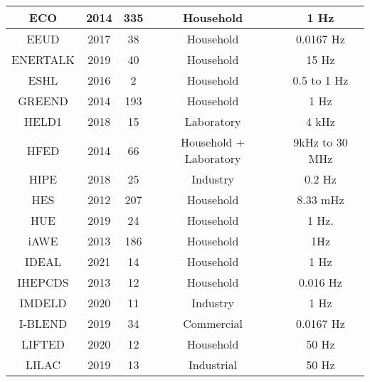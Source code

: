 \begin{table}[H]
{\begin{tabular}{|c|c|c|c|c|}
ECO \cite{ECO}                  & 2014 & 335  & Household              & 1 Hz                               \\ \hline
EEUD \cite{EEUD}                & 2017 & 38   & Household              & 0.0167 Hz                          \\ \hline
ENERTALK \cite{ENERTALK}        & 2019 & 40   & Household              & 15 Hz                              \\ \hline
ESHL \cite{ESHL}                & 2016 & 2    & Household              & {\color[HTML]{2E2E2E} 0.5 to 1 Hz} \\ \hline
GREEND \cite{GREEND}            & 2014 & 193  & Household              & 1 Hz                               \\ \hline
HELD1 \cite{HELD1}              & 2018 & 15   & Laboratory             & 4 kHz                              \\ \hline
HFED \cite{HFED}                & 2014 & 66   & Household + Laboratory & 9kHz to 30 MHz                     \\ \hline
HIPE \cite{HIPE}                & 2018 & 25   & Industry               & 0.2 Hz                             \\ \hline
HES \cite{HES}                  & 2012 & 207  & Household              & 8.33 mHz                           \\ \hline
HUE \cite{HUE}                  & 2019 & 24   & Household              & 1 Hz.                              \\ \hline
iAWE \cite{iAWE}                & 2013 & 186  & Household              & 1Hz                                \\ \hline
IDEAL \cite{IDEAL}              & 2021 & 14   & Household              & 1 Hz                               \\ \hline
IHEPCDS \cite{IHEPCDS}          & 2013 & 12   & Household              & 0.016 Hz                           \\ \hline
IMDELD \cite{IMDELD}            & 2020 & 11   & Industry               & 1 Hz                               \\ \hline
I-BLEND \cite{I-BLEND}          & 2019 & 34   & Commercial             & 0.0167 Hz                          \\ \hline
LIFTED \cite{LIFTED}            & 2020 & 12   & Household              & 50 Hz                              \\ \hline
LILAC \cite{LILAC}              & 2019 & 13   & Industrial             & 50 Hz                              \\ \hline

\end{tabular}}
\end{table}
